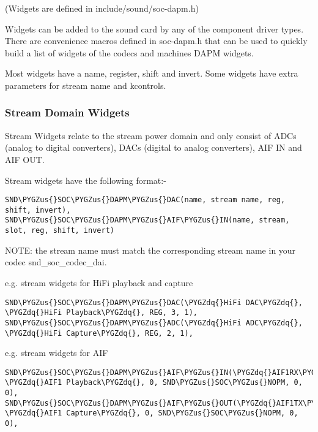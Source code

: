 \documentclass[a4paper,8pt,english]{sphinxmanual}
\def\PYGZus{\char`\_}
\def\PYGZdq{\char`\"}
\begin{document}
(Widgets are defined in include/sound/soc-dapm.h)

Widgets can be added to the sound card by any of the component driver types.
There are convenience macros defined in soc-dapm.h that can be used to quickly
build a list of widgets of the codecs and machines DAPM widgets.

Most widgets have a name, register, shift and invert. Some widgets have extra
parameters for stream name and kcontrols.


\subsubsection{Stream Domain Widgets}
\label{sound/soc/dapm:stream-domain-widgets}
Stream Widgets relate to the stream power domain and only consist of ADCs
(analog to digital converters), DACs (digital to analog converters),
AIF IN and AIF OUT.

Stream widgets have the following format:-

\begin{Verbatim}[commandchars=\\\{\}]
SND\PYGZus{}SOC\PYGZus{}DAPM\PYGZus{}DAC(name, stream name, reg, shift, invert),
SND\PYGZus{}SOC\PYGZus{}DAPM\PYGZus{}AIF\PYGZus{}IN(name, stream, slot, reg, shift, invert)
\end{Verbatim}

NOTE: the stream name must match the corresponding stream name in your codec
snd\_soc\_codec\_dai.

e.g. stream widgets for HiFi playback and capture

\begin{Verbatim}[commandchars=\\\{\}]
SND\PYGZus{}SOC\PYGZus{}DAPM\PYGZus{}DAC(\PYGZdq{}HiFi DAC\PYGZdq{}, \PYGZdq{}HiFi Playback\PYGZdq{}, REG, 3, 1),
SND\PYGZus{}SOC\PYGZus{}DAPM\PYGZus{}ADC(\PYGZdq{}HiFi ADC\PYGZdq{}, \PYGZdq{}HiFi Capture\PYGZdq{}, REG, 2, 1),
\end{Verbatim}

e.g. stream widgets for AIF

\begin{Verbatim}[commandchars=\\\{\}]
SND\PYGZus{}SOC\PYGZus{}DAPM\PYGZus{}AIF\PYGZus{}IN(\PYGZdq{}AIF1RX\PYGZdq{}, \PYGZdq{}AIF1 Playback\PYGZdq{}, 0, SND\PYGZus{}SOC\PYGZus{}NOPM, 0, 0),
SND\PYGZus{}SOC\PYGZus{}DAPM\PYGZus{}AIF\PYGZus{}OUT(\PYGZdq{}AIF1TX\PYGZdq{}, \PYGZdq{}AIF1 Capture\PYGZdq{}, 0, SND\PYGZus{}SOC\PYGZus{}NOPM, 0, 0),
\end{Verbatim}
\end{document}
